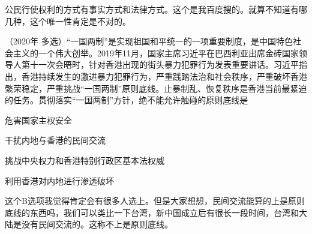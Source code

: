 \documentclass[lang=cn,blue,10pt,scheme=chinese,twocol]{zznote}
\begin{document}
\begin{solution}
	公民行使权利的方式有事实方式和法律方式。这个是我百度搜的。就算不知道有哪几种，这个唯一性肯定是不对的。
\end{solution}
\begin{example} （2020年 多选）“一国两制”是实现祖国和平统一的一项重要制度，是中国特色社会主义的一个伟大创举。2019年11月，国家主席习近平在巴西利亚出席金砖国家领导人第十一次会晤时，针对香港出现的街头暴力犯罪行为发表重要讲话。习近平指出，香港持续发生的激进暴力犯罪行为，严重践踏法治和社会秩序，严重破坏香港繁荣稳定，严重挑战“一国两制”原则底线。止暴制乱、恢复秩序是香港当前最紧迫的任务。贯彻落实“一国两制”方针，绝不能允许触碰的原则底线是
	\begin{choice}
		\item 危害国家主权安全
		\item 干扰内地与香港的民间交流
		\item 挑战中央权力和香港特别行政区基本法权威
		\item 利用香港对内地进行渗透破坏
	\end{choice}
\end{example}
\begin{solution}
	这个B选项我觉得肯定会有很多人选上。但是大家想想，民间交流能算的上是原则底线的东西吗，我们可以类比一下台湾，新中国成立后有很长一段时间，台湾和大陆是没有民间交流的。这称不上是原则底线。
\end{solution}
\end{document}
